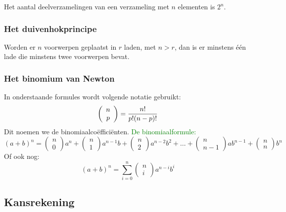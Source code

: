 Het aantal deelverzamelingen van een verzameling met $n$ elementen is $2^n$. 

\hypertarget{duivenhokprincipe}{}
\subsubsection{Het duivenhokprincipe} \label{duivenhokprincipe}

Worden er $n$ voorwerpen geplaatst in $r$ laden, met $n>r$, dan is er minstens \'e\'en lade die minstens twee voorwerpen bevat.

\hypertarget{binomium}{}
\subsubsection{Het binomium van Newton} \label{binomium}

In onderstaande formules wordt volgende notatie gebruikt:
\[\left( \begin{array}{c}n\\p \end{array} \right)=\displaystyle \frac{\displaystyle n!}{\displaystyle p!(n-p)!}\]
Dit noemen we de binomiaalco\"effici\"enten.\newline
\textcolor{green}{De binomiaalformule:}
\[(a+b)^n=\left( \begin{array}{c}n\\0 \end{array} \right)a^n + \left( \begin{array}{c}n\\1 \end{array} \right)a^{n-1}b + \left( \begin{array}{c}n\\2 \end{array} \right)a^{n-2}b^2+\ldots + \left( \begin{array}{c}n\\n-1 \end{array} \right)ab^{n-1}+\left( \begin{array}{c}n\\n \end{array} \right)b^n \]
Of ook nog:
\[(a+b)^n=\sum_{i=0}^n \left( \begin{array}{c}n\\i \end{array} \right)a^{n-i}b^i\]


\hypertarget{kansrekenen}{}
\subsection{Kansrekening} \label{kansrekenen}

